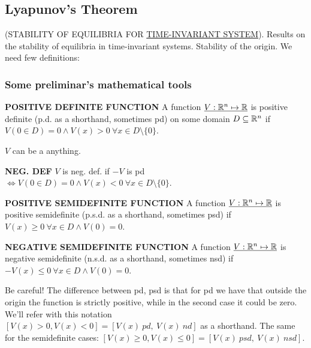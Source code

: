 \subsection{Lyapunov's Theorem}

(STABILITY OF EQUILIBRIA FOR \underline{TIME-INVARIANT SYSTEM}). Results on the stability of equilibria in time-invariant systems. Stability of the origin. We need few definitions:

\subsubsection{Some preliminar's mathematical tools} 

\begin{defn}{\textbf{POSITIVE DEFINITE FUNCTION}} \newline
A function $\underline{V: \mathbb{R}^n \mapsto \mathbb{R}}$ is positive definite (p.d. as a shorthand, sometimes pd) on some domain $D \subseteq \mathbb{R}^n$ if $V(0\in D) = 0 \land V(x) > 0\ \forall x \in D\setminus\{0\}$.
\end{defn}

$V$ can be a anything.

\begin{defn}{\textbf{NEG. DEF}} \newline
$V$ is neg. def. if $-V$ is pd $\iff V(0 \in D) = 0 \land V(x) < 0\ \forall x \in D\setminus\{0\}$.
\end{defn}

\begin{defn}{\textbf{POSITIVE SEMIDEFINITE FUNCTION}} \newline
A function $\underline{V: \mathbb{R}^n \mapsto \mathbb{R}}$ is positive semidefinite (p.s.d. as a shorthand, sometimes psd) if $V(x) \geq 0\ \forall x \in D \land V(0) = 0$.
\end{defn}

\begin{defn}{\textbf{NEGATIVE SEMIDEFINITE FUNCTION}} \newline
A function $\underline{V: \mathbb{R}^n \mapsto \mathbb{R}}$ is negative semidefinite (n.s.d. as a shorthand, sometimes nsd) if $-V(x) \leq 0\ \forall x \in D \land V(0) = 0$.
\end{defn}
Be careful! The difference between pd, psd is that for pd we have that outside the origin the function is strictly positive, while in the second case it could be zero. We'll refer with this notation $[V(x)>0,V(x)<0] = [V(x)\ pd,\ V(x)\ nd]$ as a shorthand. The same for the semidefinite cases: $[V(x)\geq 0,V(x)\leq 0] = [V(x)\ psd,\ V(x)\ nsd]$.

